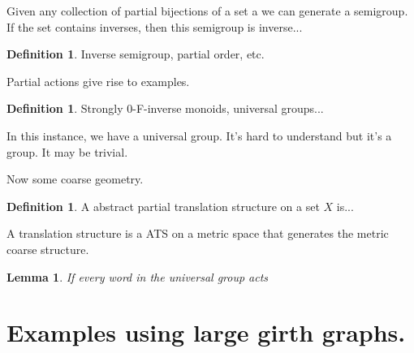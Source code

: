 \documentclass[11pt,a4paper]{amsart}
\theoremstyle{plain}
\newtheorem{lemma}[theorem]{Lemma}%
\theoremstyle{definition}%
\newtheorem{definition}[theorem]{Definition}%
\theoremstyle{remark}%
\begin{document}
Given any collection of partial bijections of a set a we can generate a semigroup. If the set contains inverses, then this semigroup is inverse...

\begin{definition}
Inverse semigroup, partial order, etc.
\end{definition}

Partial actions give rise to examples.

\begin{definition}
Strongly 0-F-inverse monoids, universal groups...
\end{definition}

In this instance, we have a universal group. It's hard to understand but it's a group. It may be trivial. 

Now some coarse geometry.

\begin{definition}
A abstract partial translation structure on a set $X$ is...

A translation structure is a ATS on a metric space that generates the metric coarse structure.
\end{definition}

\begin{lemma}
If every word in the universal group acts  
\end{lemma}

\section{Examples using large girth graphs.}



\end{document}
